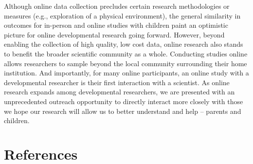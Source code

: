 \documentclass[
  man,floatsintext]{apa6}
\begin{document}
Although online data collection precludes certain research methodologies or measures (e.g., exploration of a physical environment), the general similarity in outcomes for in-person and online studies with children paint an optimistic picture for online developmental research going forward. However, beyond enabling the collection of high quality, low cost data, online research also stands to benefit the broader scientific community as a whole. Conducting studies online allows researchers to sample beyond the local community surrounding their home institution. And importantly, for many online participants, an online study with a developmental researcher is their first interaction with a scientist. As online research expands among developmental researchers, we are presented with an unprecedented outreach opportunity to directly interact more closely with those we hope our research will allow us to better understand and help -- parents and children.

\newpage

\hypertarget{references}{%
\section{References}\label{references}}
\end{document}
